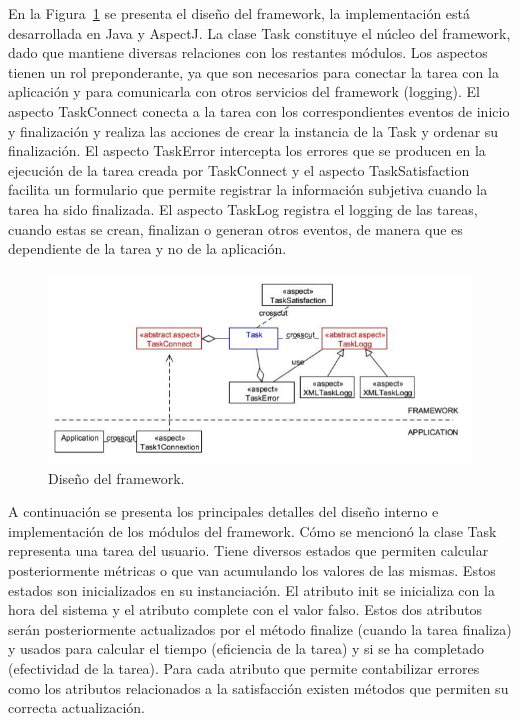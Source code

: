 En la Figura~\ref{fig:fig3} se presenta el diseño del framework, la implementación está desarrollada en Java y AspectJ. La clase Task constituye el núcleo del framework, dado que mantiene diversas relaciones con los restantes módulos. Los aspectos tienen un rol preponderante, ya que son necesarios para conectar la tarea con la aplicación y para comunicarla con otros servicios del framework (logging). El aspecto TaskConnect conecta a la tarea con los correspondientes eventos de inicio y finalización y realiza las acciones de crear la instancia de la Task y ordenar su finalización. El aspecto TaskError intercepta los errores que se producen en la ejecución de la tarea creada por TaskConnect y el aspecto TaskSatisfaction facilita un formulario que permite registrar la información subjetiva cuando la tarea ha sido finalizada. El aspecto TaskLog registra el logging de las tareas, cuando estas se crean, finalizan o generan otros eventos, de manera que es dependiente de la tarea y no de la aplicación. 

\begin{figure}[ht!]
	\centering
	\includegraphics[scale=1]{figs/fig3.png}
	\caption{\label{fig:fig3}  Diseño del framework.}
\end{figure}

A continuación se presenta los principales detalles del diseño interno e implementación de los módulos del framework. Cómo se mencionó la clase Task representa una tarea del usuario. Tiene diversos estados que permiten calcular posteriormente métricas o que van acumulando los valores de las mismas. Estos estados son inicializados en su instanciación. El atributo init se inicializa con la hora del sistema y el atributo complete con el valor falso. Estos dos atributos serán posteriormente actualizados por el método finalize (cuando la tarea finaliza) y usados para calcular el tiempo (eficiencia de la tarea) y si se ha completado (efectividad de la tarea). Para cada atributo que permite contabilizar errores como los atributos relacionados a la satisfacción existen métodos que permiten su correcta actualización. 

